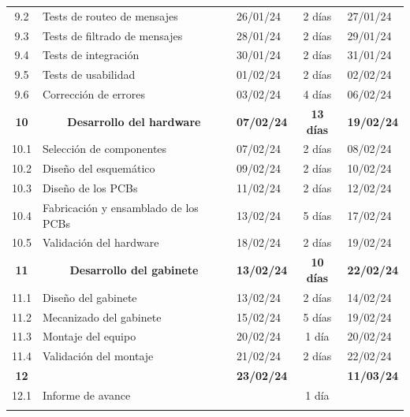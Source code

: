 \documentclass[
11pt, %
]{charter}
\begin{document}
\begin{longtable}[c]{|cllcl|}
	\rowcolor[HTML]{EFEFEF} 
	9.2 & Tests de routeo de mensajes & 26/01/24 & 2 días & 27/01/24 \\
	9.3 & Tests de filtrado de mensajes & 28/01/24 & 2 días & 29/01/24 \\
	\rowcolor[HTML]{EFEFEF} 
	9.4 & Tests de integración & 30/01/24 & 2 días & 31/01/24 \\
	9.5 & Tests de usabilidad & 01/02/24 & 2 días & 02/02/24 \\
	\rowcolor[HTML]{EFEFEF} 
	9.6 & Corrección de errores & 03/02/24 & 4 días & 06/02/24 \\
	\rowcolor[HTML]{ECF4FF} 
	\textbf{10} & \multicolumn{1}{c}{\cellcolor[HTML]{ECF4FF}\textbf{Desarrollo del hardware}} & \multicolumn{1}{c}{\cellcolor[HTML]{ECF4FF}\textbf{07/02/24}} & \textbf{13 días} & \multicolumn{1}{c|}{\cellcolor[HTML]{ECF4FF}\textbf{19/02/24}} \\
	10.1 & Selección de componentes & 07/02/24 & 2 días & 08/02/24 \\
	\rowcolor[HTML]{EFEFEF} 
	10.2 & Diseño del esquemático & 09/02/24 & 2 días & 10/02/24 \\
	10.3 & Diseño de los PCBs & 11/02/24 & 2 días & 12/02/24 \\
	\rowcolor[HTML]{EFEFEF} 
	10.4 & Fabricación y ensamblado de los PCBs & 13/02/24 & 5 días & 17/02/24 \\
	10.5 & Validación del hardware & 18/02/24 & 2 días & 19/02/24 \\
	\rowcolor[HTML]{ECF4FF} 
	\textbf{11} & \multicolumn{1}{c}{\cellcolor[HTML]{ECF4FF}\textbf{Desarrollo del gabinete}} & \textbf{13/02/24} & \textbf{10 días} & \textbf{22/02/24} \\
	11.1 & Diseño del gabinete & 13/02/24 & 2 días & 14/02/24 \\
	\rowcolor[HTML]{EFEFEF} 
	11.2 & Mecanizado del gabinete & 15/02/24 & 5 días & 19/02/24 \\
	11.3 & Montaje del equipo & 20/02/24 & 1 día & 20/02/24 \\
	\rowcolor[HTML]{EFEFEF} 
	11.4 & Validación del montaje & 21/02/24 & 2 días & 22/02/24 \\
	\rowcolor[HTML]{ECF4FF} 
	{\color[HTML]{000000} \textbf{12}} & \multicolumn{1}{c}{\cellcolor[HTML]{ECF4FF}{\color[HTML]{000000} \textbf{Documentación}}} & {\color[HTML]{000000} \textbf{23/02/24}} & {\color[HTML]{000000} \textbf{}} & {\color[HTML]{000000} \textbf{11/03/24}} \\
	12.1 & Informe de avance &  & 1 día &  \\
	\rowcolor[HTML]{EFEFEF} 

\end{longtable}
\end{document}
